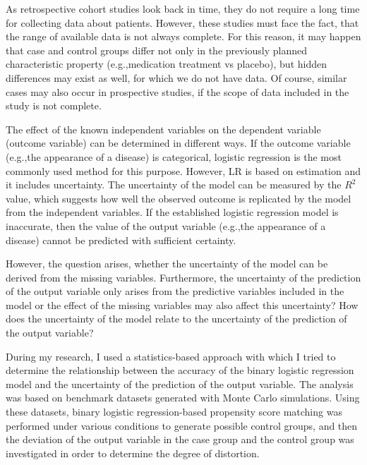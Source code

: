 		As retrospective cohort studies look back in time, they do not require a long time for collecting data about patients. However, these studies must face the fact, that the range of available data is not always complete. For this reason, it may happen that case and control groups differ not only in the previously planned characteristic property (e.g.,medication treatment vs placebo), but hidden differences may exist as well, for which we do not have data. Of course, similar cases may also occur in prospective studies, if the scope of data included in the study is not complete.
										
		The effect of the known independent variables on the dependent variable (outcome variable) can be determined in different ways. If the outcome variable (e.g.,the appearance of a disease) is categorical, logistic regression is the most commonly used method for this purpose. However, LR is based on estimation and it includes uncertainty. The uncertainty of the model can be measured by the $R^2$ value, which suggests how well the observed outcome is replicated by the model from the independent variables. If the established logistic regression model is inaccurate, then the value of the output variable (e.g.,the appearance of a disease) cannot be predicted with sufficient certainty.
										
		However, the question arises, whether the uncertainty of the model can be derived from the missing variables. Furthermore, the uncertainty of the prediction of the output variable only arises from the predictive variables included in the model or the effect of the missing variables may also affect this uncertainty? How does the uncertainty of the model relate to the uncertainty of the prediction of the output variable?
										
		During my research, I used a statistics-based approach with which I tried to determine the relationship between the accuracy of the binary logistic regression model and the uncertainty of the prediction of the output variable. The analysis was based on benchmark datasets generated with Monte Carlo simulations. Using these datasets, binary logistic regression-based propensity score matching was performed under various conditions to generate possible control groups, and then the deviation of the output variable in the case group and the control group was investigated in order to determine the degree of distortion. %
										
